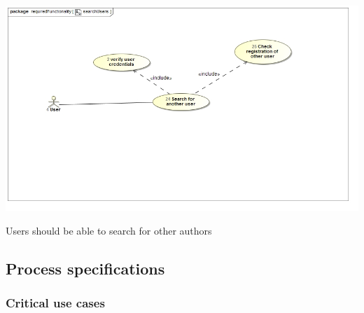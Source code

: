 \documentclass[a4paper,12pt]{report}
\begin{document}
\begin{flushleft}
	\includegraphics[scale=0.5]{./images/uc__searchUsers.jpg} 
	\begin{center}
		Users should be able to search for other authors
	\end{center}
\end{flushleft}

\subsection{Process specifications}
\subsubsection{Critical use cases}
\end{document}
